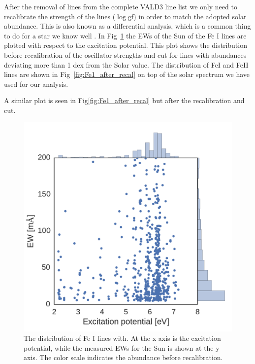 \documentclass{aa}
\begin{document}
After the removal of lines from the complete VALD3 line list we only
need to recalibrate the strength of the lines ($\log \mathrm{gf}$) in
order to match the adopted solar abundance. This is also known as a
differential analysis, which is a common thing to do for a star we know
well \citep{Sousa2008a,Onehag2012}. In Fig~\ref{fig:Fe1_before_recal}
the EWs of the Sun of the Fe I lines are plotted with respect to
the excitation potential. This plot shows the distribution before
recalibration of the oscillator strengths and cut for lines with
abundances deviating more than 1 dex from the Solar value. The distribution
of FeI and FeII lines are shown in Fig~\ref{fig:Fe1_after_recal} on top
of the solar spectrum we have used for our analysis.


A similar
plot is seen in Fig\ref{fig:Fe1_after_recal} but after the recalibration
and cut.

\begin{figure}[tpb]
    \centering
    \includegraphics[width=1.0\linewidth]{figures/EWvsEP.pdf}
    \caption{The distribution of Fe I lines with. At the x axis is
    the excitation potential, while the measured EWs for the Sun is
    shown at the y axis. The color scale indicates the abundance before
    recalibration.}
    \label{fig:Fe1_before_recal}
\end{figure}
\end{document}
